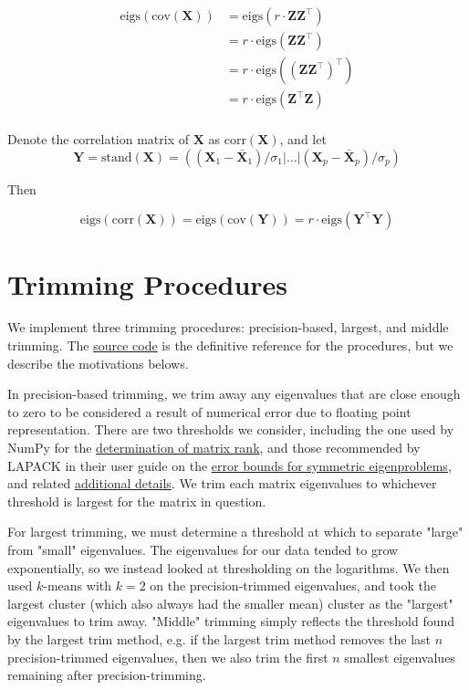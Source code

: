 \documentclass[12pt]{spieman}  %
\begin{document}
\begin{spacing}{2}
\begin{align*}
\text{eigs}\left( \text{cov}(\mathbf{X})  \right)
&= \text{eigs}(r \cdot \mathbf{Z}\mathbf{Z}^{\top}) \\
&= r \cdot \text{eigs}(\mathbf{Z}\mathbf{Z}^{\top}) \\
&= r \cdot \text{eigs}((\mathbf{Z}\mathbf{Z}^{\top})^{\top}) \\
&= r \cdot \text{eigs}(\mathbf{Z}^{\top}\mathbf{Z}) \\
\end{align*}

Denote the correlation matrix of \(\mathbf{X}\) as \(\text{corr}(\mathbf{X})\), and let
\[
\mathbf{Y} = \text{stand}(\mathbf{X}) =
\left(
(\mathbf{X}_1 - \bar{\mathbf{X}}_1) / \sigma_1 | \dots | (\mathbf{X}_p - \bar{\mathbf{X}}_p) / \sigma_p
\right)
\]

Then

\[
\text{eigs}\left( \text{corr}(\mathbf{X})  \right)
= \text{eigs}\left( \text{cov}(\mathbf{Y})  \right)
= r \cdot \text{eigs}(\mathbf{Y}^{\top}\mathbf{Y})
\]

\section{Trimming Procedures}
\label{sec:trimming}

We implement three trimming procedures: precision-based, largest, and middle
trimming. The
\href{https://github.com/DM-Berger/random-matrix-fmri/blob/7c9e4187f582dedee728cd7193b8894d928c2f00/code/rmt/updated_dataset.py#L431-L444}{source
code} is the definitive reference for the procedures, but we describe the
motivations belows.

In precision-based trimming, we trim away any eigenvalues that are close enough
to zero to be considered a result of numerical error due to floating point
representation. There are two thresholds we consider, including the one used by
NumPy\cite{harrisArrayProgrammingNumPy2020} for the
\href{https://numpy.org/doc/stable/reference/generated/numpy.linalg.matrix_rank.html}{determination
of matrix rank}, and those recommended by LAPACK\cite{laug} in their user
guide\cite{andersonLAPACKUsersGuide1999a} on the
\href{https://netlib.org/lapack/lug/node89.html}{error bounds for symmetric
eigenproblems}, and related
\href{https://netlib.org/lapack/lug/node90.html}{additional details}. We trim
each matrix eigenvalues to whichever threshold is largest for the matrix in
question.

For largest trimming, we must determine a threshold at which to separate
"large" from "small" eigenvalues. The eigenvalues for our data tended to grow
exponentially, so we instead looked at thresholding on the logarithms. We then
used \(k\)-means with \(k=2\) on the precision-trimmed eigenvalues, and took
the largest cluster (which also always had the smaller mean) cluster as the
"largest" eigenvalues to trim away. "Middle" trimming simply reflects the
threshold found by the largest trim method, e.g. if the largest trim method
removes the last \(n\) precision-trimmed eigenvalues, then we also trim the
first \(n\) smallest eigenvalues remaining after precision-trimming.


\end{spacing}
\end{document}
